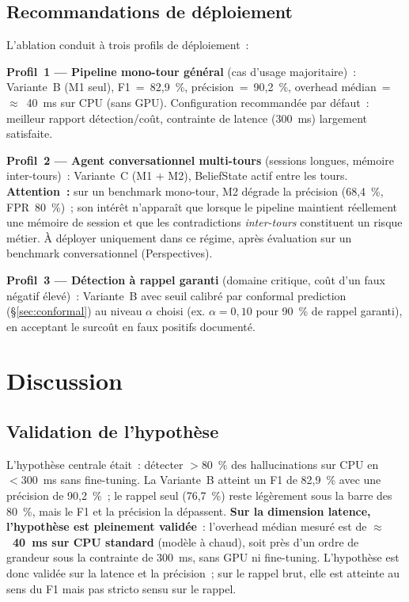 \documentclass[12pt,a4paper]{article}
\begin{document}
\subsection{Recommandations de déploiement}

L'ablation conduit à trois profils de déploiement~:

\textbf{Profil~1 --- Pipeline mono-tour général} (cas d'usage majoritaire)~: Variante~B (M1 seul), F1~=~82,9~\%, précision~=~90,2~\%, overhead médian~=~$\approx$~40~ms sur CPU (sans GPU). Configuration recommandée par défaut~: meilleur rapport détection/coût, contrainte de latence (300~ms) largement satisfaite.

\textbf{Profil~2 --- Agent conversationnel multi-tours} (sessions longues, mémoire inter-tours)~: Variante~C (M1 + M2), BeliefState actif entre les tours. \textbf{Attention~:} sur un benchmark mono-tour, M2 dégrade la précision (68,4~\%, FPR~80~\%)~; son intérêt n'apparaît que lorsque le pipeline maintient réellement une mémoire de session et que les contradictions \emph{inter-tours} constituent un risque métier. À déployer uniquement dans ce régime, après évaluation sur un benchmark conversationnel (Perspectives).

\textbf{Profil~3 --- Détection à rappel garanti} (domaine critique, coût d'un faux négatif élevé)~: Variante~B avec seuil calibré par conformal prediction (§\ref{sec:conformal}) au niveau $\alpha$ choisi (ex. $\alpha=0{,}10$ pour 90~\% de rappel garanti), en acceptant le surcoût en faux positifs documenté.

\section{Discussion}

\subsection{Validation de l'hypothèse}

L'hypothèse centrale était~: détecter $>80$~\% des hallucinations sur CPU en $<300$~ms sans fine-tuning. La Variante~B atteint un F1 de 82,9~\% avec une précision de 90,2~\%~; le rappel seul (76,7~\%) reste légèrement sous la barre des 80~\%, mais le F1 et la précision la dépassent. \textbf{Sur la dimension latence, l'hypothèse est pleinement validée}~: l'overhead médian mesuré est de \textbf{$\approx$~40~ms sur CPU standard} (modèle à chaud), soit près d'un ordre de grandeur sous la contrainte de 300~ms, sans GPU ni fine-tuning. L'hypothèse est donc validée sur la latence et la précision~; sur le rappel brut, elle est atteinte au sens du F1 mais pas stricto sensu sur le rappel.
\end{document}
